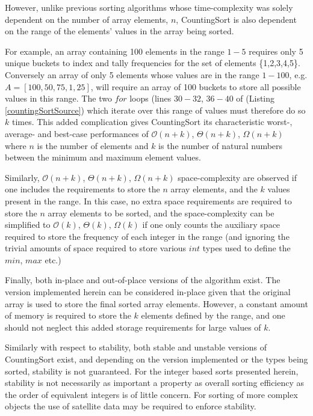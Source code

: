 \documentclass[12pt,a4paper]{article}
\begin{document}
However, unlike previous sorting algorithms whose time-complexity was solely dependent on the number of array elements, $n$, CountingSort is also dependent on the range of the elements' values in the array being sorted. 

For example, an array containing 100 elements in the range $1-5$ requires only 5 unique buckets to index and tally frequencies for the set of elements \{1,2,3,4,5\}. Conversely an array of only 5 elements whose values are in the range $1-100$, e.g. $A = [100,50,75,1,25]$, will require an array of 100 buckets to store all possible values in this range. The two $for$ loops (lines $30-32$, $36-40$ of (Listing \ref{countingSortSource}) which iterate over this range of values must therefore do so $k$ times. This added complication gives CountingSort its characteristic worst-, average- and best-case performances of $\mathcal{O}(n+k)$, $\Theta(n+k)$, $\Omega(n+k)$ where $n$ is the number of elements and $k$ is the number of natural numbers between the minimum and maximum element values. 

Similarly, $\mathcal{O}(n+k)$, $\Theta(n+k)$, $\Omega(n+k)$ space-complexity are observed if one includes the requirements to store the $n$ array elements, and the $k$ values present in the range. In this case, no extra space requirements are required to store the $n$ array elements to be sorted, and the space-complexity can be simplified to $\mathcal{O}(k)$, $\Theta(k)$, $\Omega(k)$ if one only counts the auxiliary space required to store the frequency of each integer in the range (and ignoring the trivial amounts of space required to store various $int$ types used to define the $min$, $max$ etc.) 

Finally, both in-place and out-of-place versions of the algorithm exist. The version implemented herein can be considered in-place given that the original array is used to store the final sorted array elements. However, a constant amount of memory is required to store the $k$ elements defined by the range, and one should not neglect this added storage requirements for large values of $k$. 

Similarly with respect to stability, both stable and unstable versions of CountingSort exist, and depending on the version implemented or the types being sorted, stability is not guaranteed. For the integer based sorts presented herein, stability is not necessarily as important a property as overall sorting efficiency as the order of equivalent integers is of little concern. For sorting of more complex objects the use of satellite data may be required to enforce stability.
\end{document}
